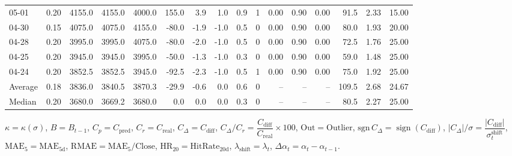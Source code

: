 \begin{threeparttable}
{\begin{tabular}{lrrrrrrrrrrrrrrr}
  05-01 &     0.20 & 4155.0 & 4155.0 & 4000.0 &      155.0 &            3.9 &                      1.0 &                 0.9 &              1 &       0.00 &      0.90 &           0.00 &             91.5 &            2.33 &                  15.00 \\
  04-30 &     0.15 & 4075.0 & 4075.0 & 4155.0 &      -80.0 &           -1.9 &                     -1.0 &                 0.5 &              0 &       0.00 &      0.90 &           0.00 &             80.0 &            1.93 &                  20.00 \\
  04-28 &     0.20 & 3995.0 & 3995.0 & 4075.0 &      -80.0 &           -2.0 &                     -1.0 &                 0.5 &              0 &       0.00 &      0.90 &           0.00 &             72.5 &            1.76 &                  25.00 \\
  04-25 &     0.20 & 3945.0 & 3945.0 & 3995.0 &      -50.0 &           -1.3 &                     -1.0 &                 0.3 &              0 &       0.00 &      0.90 &           0.00 &             59.0 &            1.48 &                  25.00 \\
  04-24 &     0.20 & 3852.5 & 3852.5 & 3945.0 &      -92.5 &           -2.3 &                     -1.0 &                 0.5 &              1 &       0.00 &      0.90 &           0.00 &             75.0 &            1.92 &                  25.00 \\
Average &     0.18 & 3836.0 & 3840.5 & 3870.3 &      -29.9 &           -0.6 &                      0.0 &                 0.6 &              0 &         -- &        -- &             -- &            109.5 &            2.68 &                  24.67 \\
 Median &     0.20 & 3680.0 & 3669.2 & 3680.0 &        0.0 &            0.0 &                      0.0 &                 0.3 &              0 &         -- &        -- &             -- &             80.5 &            2.27 &                  25.00 \\
\bottomrule
\end{tabular}
}
\begin{tablenotes}\footnotesize
\item $\kappa=\kappa(\sigma)$, $B=B_{t-1}$, $C_p=C_{\text{pred}}$, $C_r=C_{\text{real}}$, $C_\Delta=C_{\text{diff}}$, $C_\Delta/C_r=\dfrac{C_{\text{diff}}}{C_{\text{real}}}\times100$, $\mathrm{Out}=\text{Outlier}$, $\mathrm{sgn}\,C_\Delta=\operatorname{sign}(C_{\text{diff}})$, $|C_\Delta|/\sigma=\dfrac{|C_{\text{diff}}|}{\sigma_t^{\text{shift}}}$, $\mathrm{MAE}_5=\mathrm{MAE}_{5\text{d}}$, $\mathrm{RMAE}= \mathrm{MAE}_5 / \text{Close}$, $\mathrm{HR}_{20}=\mathrm{HitRate}_{20\text{d}}$, 
$\lambda_{\text{shift}}=\lambda_t$, 
$\Delta\alpha_t=\alpha_t-\alpha_{t-1}$.
\end{tablenotes}
\end{threeparttable}
\endgroup

